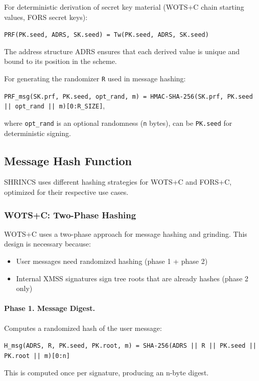 For deterministic derivation of secret key material (WOTS+C chain starting values, FORS secret keys):

\begin{center}
    \texttt{PRF(PK.seed, ADRS, SK.seed) = Tw(PK.seed, ADRS, SK.seed)}
\end{center}

The address structure ADRS ensures that each derived value is unique and bound to its position in the scheme. 

For generating the randomizer \texttt{R} used in message hashing:

\begin{center}
    \texttt{PRF\_msg(SK.prf, PK.seed, opt\_rand, m) = HMAC-SHA-256(SK.prf, PK.seed || opt\_rand || m)[0:R\_SIZE]},
\end{center}
where \texttt{opt\_rand} is an optional randomness (\texttt{n} bytes), can be \texttt{PK.seed} for deterministic signing.

\subsection{Message Hash Function}
SHRINCS uses different hashing strategies for WOTS+C and FORS+C, optimized for their respective use cases.

\subsubsection{WOTS+C: Two-Phase Hashing}
WOTS+C uses a two-phase approach for message hashing and grinding. This design is necessary because:
\begin{itemize}
    \item User messages need randomized hashing (phase 1 + phase 2)
    \item Internal XMSS signatures sign tree roots that are already hashes (phase 2 only)
\end{itemize}

\paragraph{Phase 1. Message Digest.} Computes a randomized hash of the user message:
\begin{center}
    \texttt{H\_msg(ADRS, R, PK.seed, PK.root, m) = SHA-256(ADRS || R || PK.seed || PK.root || m)[0:n]}
\end{center}
This is computed once per signature, producing an n-byte digest.

